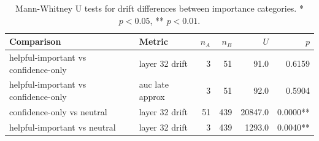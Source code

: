 \begin{table}[h]
\centering\small
\begin{tabular}{llrrrr}
\toprule
Comparison & Metric & $n_A$ & $n_B$ & $U$ & $p$ \\
\midrule
  helpful-important vs confidence-only & layer 32 drift & 3 & 51 & 91.0 & 0.6159 \\
  helpful-important vs confidence-only & auc late approx & 3 & 51 & 92.0 & 0.5904 \\
  confidence-only vs neutral & layer 32 drift & 51 & 439 & 20847.0 & 0.0000** \\
  helpful-important vs neutral & layer 32 drift & 3 & 439 & 1293.0 & 0.0040** \\
\bottomrule
\end{tabular}
\caption{Mann-Whitney U tests for drift differences between importance categories. * $p < 0.05$, ** $p < 0.01$.}
\label{tab:e4_mechanistic_tests}
\end{table}
